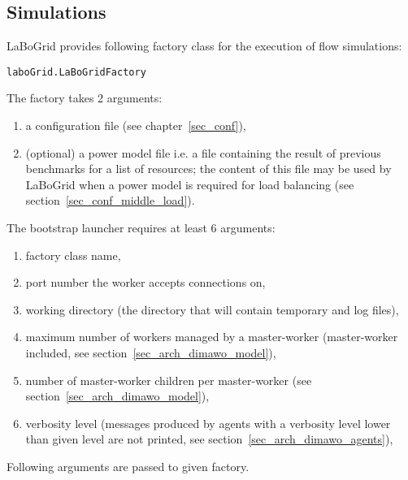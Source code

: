\subsection{Simulations}

LaBoGrid provides following factory class for the execution of flow simulations: 
%
\begin{center}
\texttt{laboGrid.LaBoGridFactory}\\
\end{center}
%
The factory takes 2 arguments:
%
\begin{enumerate}
	\item a configuration file (see chapter~\ref{sec_conf}),
	\item (optional) a power model file i.e. a file containing the result of
	previous benchmarks for a list of resources; the content of this file may be
	used by LaBoGrid when a power model is required for load balancing (see
	section~\ref{sec_conf_middle_load}).
\end{enumerate}

The bootstrap launcher requires at least 6 arguments:
%
\begin{enumerate}
	\item factory class name,
	\item port number the worker accepts connections on,
	\item working directory (the directory that will contain temporary and
	log files),
	\item maximum number of workers managed by a master-worker
	(master-worker included, see section~\ref{sec_arch_dimawo_model}),
	\item number of master-worker children per master-worker (see
	section~\ref{sec_arch_dimawo_model}),
	\item verbosity level (messages produced by agents with a verbosity level
	lower than given level are not printed, see
	section~\ref{sec_arch_dimawo_agents}),
\end{enumerate}
%
Following arguments are passed to given factory.


